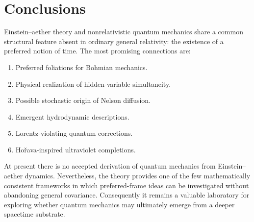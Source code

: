 \documentclass[11pt]{article}
\begin{document}
\section{Conclusions}
Einstein--aether theory and nonrelativistic quantum mechanics share a
common structural feature absent in ordinary general relativity:
the existence of a preferred notion of time.
The most promising connections are:
\begin{enumerate}
\item Preferred foliations for Bohmian mechanics.
\item Physical realization of hidden-variable simultaneity.
\item Possible stochastic origin of Nelson diffusion.
\item Emergent hydrodynamic descriptions.
\item Lorentz-violating quantum corrections.
\item Ho\v rava-inspired ultraviolet completions.
\end{enumerate}
At present there is no accepted derivation of quantum mechanics from
Einstein--aether dynamics. Nevertheless, the theory provides one of
the few mathematically consistent frameworks in which preferred-frame
ideas can be investigated without abandoning general covariance.
Consequently it remains a valuable laboratory for exploring whether
quantum mechanics may ultimately emerge from a deeper spacetime
substrate.
\end{document}
